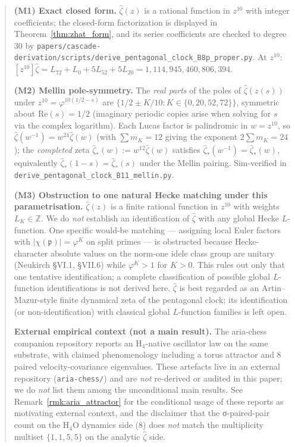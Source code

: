\documentclass[11pt, a4paper]{amsart}
\theoremstyle{definition}
\newcommand{\Z}{\mathbb{Z}}
\begin{document}
\begin{abstract}
\textbf{(M1) Exact closed form.} $\widehat\zeta(z)$ is a rational
function in $z^{10}$ with integer coefficients; the closed-form
factorization is displayed in
Theorem~\ref{thm:zhat_form}, and its series coefficients are
checked to degree 30 by
\texttt{papers/cascade-derivation/scripts/derive\_pentagonal\_clock\_B8p\_proper.py}.
At $z^{10}$: $[z^{10}]\widehat\zeta = L_{72} + L_0 + 5L_{52} + 5L_{20} = 1{,}114{,}945{,}460{,}806{,}394$.

\textbf{(M2) Mellin pole-symmetry.}
The \emph{real parts} of the poles of $\widehat\zeta(z(s))$ under
$z^{10} = \varphi^{10(1/2-s)}$ are
$\{1/2 \pm K/10 : K \in \{0,20,52,72\}\}$, symmetric about
$\mathrm{Re}(s) = 1/2$ (imaginary periodic copies arise when
solving for $s$ via the complex logarithm).  Each Lucas factor is
palindromic in $w = z^{10}$, so $\widehat\zeta(w^{-1}) = w^{24}
\widehat\zeta(w)$ (with $\sum m_K = 12$ giving the exponent
$2\sum m_K = 24$); the \emph{completed} zeta
$\widehat\zeta_\ast(w) := w^{12} \widehat\zeta(w)$ satisfies
$\widehat\zeta_\ast(w^{-1}) = \widehat\zeta_\ast(w)$, equivalently
$\widehat\zeta_\ast(1-s) = \widehat\zeta_\ast(s)$ under the
Mellin pairing.  Sim-verified in
\texttt{derive\_pentagonal\_clock\_B11\_mellin.py}.

\textbf{(M3) Obstruction to one natural Hecke matching under
this parametrisation.}
$\widehat\zeta(z)$ is a finite rational function in $z^{10}$ with
weights $L_K \in \Z$.  We do \emph{not} establish an identification
of $\widehat\zeta$ with any global Hecke $L$-function.  One specific
would-be matching --- assigning local Euler factors with
$|\chi(\mathfrak p)| = \varphi^K$ on split primes --- is obstructed
because Hecke-character absolute values on the norm-one idele class
group are unitary (Neukirch §VI.1, §VII.6) while $\varphi^K > 1$
for $K > 0$.  This rules out only that one tentative identification;
a complete classification of possible global $L$-function
identifications is not derived here.  $\widehat\zeta$ is best
regarded as an Artin--Mazur-style finite dynamical zeta of the
pentagonal clock; its identification (or non-identification) with
classical global $L$-function families is left open.

\noindent\textbf{External empirical context (not a main result).}
The aria-chess companion repository reports an H$_4$-native
oscillator law on the same substrate, with claimed phenomenology
including a torus attractor and 8 paired velocity-covariance
eigenvalues.  These artefacts live in an external repository
(\texttt{aria-chess/}) and are \emph{not} re-derived or audited
in this paper; we do \emph{not} list them among the unconditional
main results.  See Remark~\ref{rmk:aria_attractor} for the
conditional usage of these reports as motivating external
context, and the disclaimer that the σ-paired-pair count on the
H$_4$O dynamics side (8) does \emph{not} match the multiplicity
multiset $\{1,1,5,5\}$ on the analytic $\widehat\zeta$ side.


\end{abstract}
\end{document}

